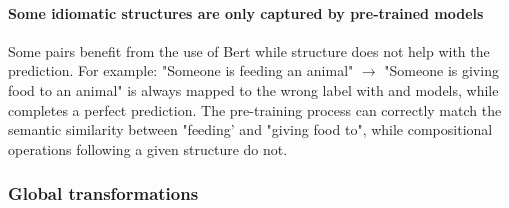 \paragraph{Some idiomatic structures are only captured by pre-trained models}

Some pairs benefit from the use of Bert while structure does not help with the prediction. For example: "Someone is feeding an animal" $\rightarrow$ "Someone is giving food to an animal" is always mapped to the wrong label with \dep and \const models, while \cls completes a perfect prediction. The \bert pre-training process can correctly match the semantic similarity between "feeding' and "giving food to", while compositional operations following a given structure do not.

\subsubsection{Global transformations} 



